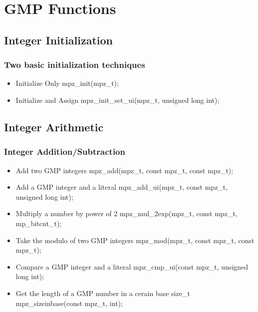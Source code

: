 \section{GMP Functions}


\subsection{Integer Initialization}

\begin{frame}
\frametitle{Two basic initialization techniques}
\begin{itemize}
  \item Initialize Only
  mpz{\_}init(mpz{\_}t);
  \item Initialize and Assign
  mpz{\_}init{\_}set{\_}ui(mpz{\_}t, unsigned long int);
\end{itemize}
\end{frame}


\subsection{Integer Arithmetic}

\begin{frame}
\frametitle{Integer Addition/Subtraction}
\begin{itemize}
  \item Add two GMP integers
  mpz{\_}add(mpz{\_}t, const mpz{\_}t, const mpz{\_}t);
  \item Add a GMP integer and a literal
  mpz{\_}add{\_}ui(mpz{\_}t, const mpz{\_}t, unsigned long int);
  \item Multiply a number by power of 2
  mpz{\_}mul{\_}2exp(mpz{\_}t, const mpz{\_}t, mp{\_}bitcnt{\_}t);
  \item Take the modulo of two GMP integers
  mpz{\_}mod(mpz{\_}t, const mpz{\_}t, const mpz{\_}t);
  \item Compare a GMP integer and a literal
  mpz{\_}cmp{\_}ui(const mpz{\_}t, unsigned long int);
  \item Get the length of a GMP number in a cerain base
  size{\_}t mpz{\_}sizeinbase(const mpz{\_}t, int);
\end{itemize}
\end{frame}


